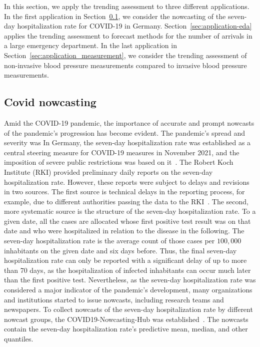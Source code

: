 In this section, we apply the trending assessment to three different applications.
In the first application in Section~\ref{sec:application-covid}, we consider the nowcasting of the seven-day hospitalization rate for COVID-19 in Germany.
Section~\ref{sec:application-eda} applies the trending assessment to forecast methods for the number of arrivals in a large emergency department.
In the last application in Section~\ref{sec:application_measurement}, we consider the trending assessment of non-invasive blood pressure measurements compared to invasive blood pressure measurements.

\subsection{Covid nowcasting} \label{sec:application-covid}

Amid the COVID-19 pandemic, the importance of accurate and prompt nowcasts of the pandemic's progression has become evident.
The pandemic's spread and severity was 
In Germany, the seven-day hospitalization rate was established as a central steering measure for COVID-19 measures in November 2021, and the imposition of severe public restrictions was based on it~\parencite{RobertKochInstitute2021}. 
The Robert Koch Institute (RKI) provided preliminary daily reports on the seven-day hospitalization rate.
However, these reports were subject to delays and revisions in two sources.
The first source is technical delays in the reporting process, for example, due to different authorities passing the data to the RKI~\parencite{RobertKochInstitute2024}.
The second, more systematic source is the structure of the seven-day hospitalization rate.
To a given date, all the cases are allocated whose first positive test result was on that date and who were hospitalized in relation to the disease in the following.
The seven-day hospitalization rate is the average count of those cases per $100,000$ inhabitants on the given date and six days before.
Thus, the final seven-day hospitalization rate can only be reported with a significant delay of up to more than 70 days, as the hospitalization of infected inhabitants can occur much later than the first positive test.
Nevertheless, as the seven-day hospitalization rate was considered a major indicator of the pandemic's development, many organizations and institutions started to issue nowcasts, including research teams and newspapers.
To collect nowcasts of the seven-day hospitalization rate by different nowcast groups, the COVID19-Nowcasting-Hub was established~\parencite{ChairOfEconometricsAndStatisticsAtKarlsruheInstituteOfTechnology2024}.
The nowcasts contain the seven-day hospitalization rate's predictive mean, median, and other quantiles.

